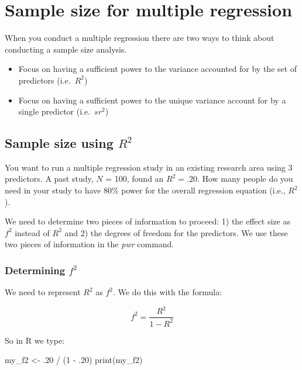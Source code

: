 \documentclass[
]{krantz}
\makeatletter
\newenvironment{Shaded}{\begin{snugshade}}{\end{snugshade}}
\newcommand{\DecValTok}[1]{\textcolor[rgb]{0.06,0.06,0.06}{#1}}
\newcommand{\FunctionTok}[1]{\textcolor[rgb]{0,0,0}{#1}}
\newcommand{\NormalTok}[1]{#1}
\newcommand{\OtherTok}[1]{\textcolor[rgb]{0.37,0.37,0.37}{#1}}
\newcommand{\SpecialCharTok}[1]{\textcolor[rgb]{0,0,0}{#1}}
\newenvironment{kframe}{%
\medskip{}
\setlength{\fboxsep}{.8em}
 \def\at@end@of@kframe{}%
 \ifinner\ifhmode%
  \def\at@end@of@kframe{\end{minipage}}%
  \begin{minipage}{\columnwidth}%
 \fi\fi%
 \def\FrameCommand##1{\hskip\@totalleftmargin \hskip-\fboxsep
 \colorbox{shadecolor}{##1}\hskip-\fboxsep
     \hskip-\linewidth \hskip-\@totalleftmargin \hskip\columnwidth}%
 \MakeFramed {\advance\hsize-\width
   \@totalleftmargin\z@ \linewidth\hsize
   \@setminipage}}%
 {\par\unskip\endMakeFramed%
 \at@end@of@kframe}
\renewenvironment{Shaded}{\begin{kframe}}{\end{kframe}}
\makeatother
\begin{document}
\hypertarget{sample-size-for-multiple-regression}{%
\chapter{Sample size for multiple regression}\label{sample-size-for-multiple-regression}}

When you conduct a multiple regression there are two ways to think about conducting a sample size analysis.

\begin{itemize}
\item
  Focus on having a sufficient power to the variance accounted for by the set of predictors (i.e.~\(R^2\))
\item
  Focus on having a sufficient power to the unique variance account for by a single predictor (i.e.~\(sr^2\))
\end{itemize}

\hypertarget{sample-size-using-r2}{%
\section{\texorpdfstring{Sample size using \(R^2\)}{Sample size using R\^{}2}}\label{sample-size-using-r2}}

You want to run a multiple regression study in an existing research area using 3 predictors. A past study, \(N\) = 100, found an \(R^2=.20\). How many people do you need in your study to have 80\% power for the overall regression equation (i.e., \(R^2\)).

We need to determine two pieces of information to proceed: 1) the effect size as \(f^2\) instead of \(R^2\) and 2) the degrees of freedom for the predictors. We use these two pieces of information in the \emph{pwr} command.

\hypertarget{determining-f2}{%
\subsection{\texorpdfstring{Determining \(f^2\)}{Determining f\^{}2}}\label{determining-f2}}

We need to represent \(R^2\) as \(f^2\). We do this with the formula:

\[
f^2=\frac{R^2}{1-R^2}
\]

So in R we type:

\begin{Shaded}
\begin{Highlighting}[]
\NormalTok{my\_f2 }\OtherTok{\textless{}{-}}\NormalTok{ .}\DecValTok{20} \SpecialCharTok{/}\NormalTok{ (}\DecValTok{1} \SpecialCharTok{{-}}\NormalTok{ .}\DecValTok{20}\NormalTok{)}
\FunctionTok{print}\NormalTok{(my\_f2)}
\end{Highlighting}
\end{Shaded}
\end{document}
